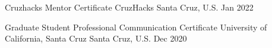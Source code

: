 



\begin{cvhonors}

  \cvhonor
    {Cruzhacks Mentor Certificate} %
    {CruzHacks} %
    {Santa Cruz, U.S.} %
    {Jan 2022} %

  \cvhonor
    {Graduate Student Professional Communication Certificate} %
    {University of California, Santa Cruz} %
    {Santa Cruz, U.S.} %
    {Dec 2020} %

\end{cvhonors}
